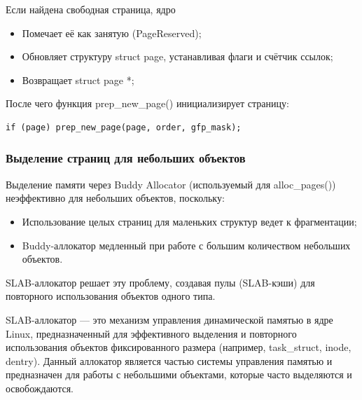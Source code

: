 Если найдена свободная страница, ядро
\begin{itemize}
\item Помечает её как занятую (PageReserved);
\item Обновляет структуру struct page, устанавливая флаги и счётчик ссылок;
\item Возвращает struct page *;
\end{itemize}

После чего функция prep\_new\_page() инициализирует страницу:
\begin{lstlisting}
if (page) prep_new_page(page, order, gfp_mask);
\end{lstlisting}

\subsubsection{Выделение страниц для небольших объектов}

Выделение памяти через Buddy Allocator (используемый для {alloc\_pages()}) неэффективно для небольших объектов, поскольку:
\begin{itemize}
    \item Использование целых страниц для маленьких структур ведет к фрагментации;
    \item Buddy-аллокатор медленный при работе с большим количеством небольших объектов.
\end{itemize}

SLAB-аллокатор решает эту проблему, создавая пулы (SLAB-кэши) для повторного использования объектов одного типа.

SLAB-аллокатор --- это механизм управления динамической памятью в ядре Linux, предназначенный для эффективного выделения и повторного использования объектов фиксированного размера (например, task\_struct, inode, dentry).
Данный аллокатор является частью системы управления памятью и предназначен для работы с небольшими объектами, которые часто выделяются и освобождаются.

